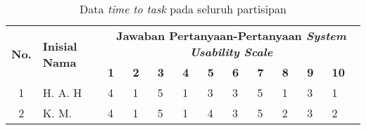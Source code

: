 \begin{table}[h]
    \centering
    \caption{Data \textit{time to task} pada seluruh partisipan}
    \label{system-usability-scale-data}
    \begin{tabularx}{\linewidth}{|c|p{3cm}|X|X|X|X|X|X|X|X|X|X|} \hline
        \multirow{2}{*}{\textbf{No.}} & \multirow{2}{*}{\textbf{Inisial Nama}} & \multicolumn{10}{c|}{\textbf{Jawaban Pertanyaan-Pertanyaan \textit{System Usability Scale}}}\\ \cline{3-12}
        & & \textbf{1} & \textbf{2} & \textbf{3} & \textbf{4} & \textbf{5} & \textbf{6} & \textbf{7} & \textbf{8} & \textbf{9} & \textbf{10}\\ \hline
        1 & H. A. H & 4 & 1 & 5 & 1 & 3 & 3 & 5 & 1 & 3 & 1\\ \hline
        2 & K. M. & 4 & 1 & 5 & 1 & 4 & 3 & 5 & 2 & 3 & 2\\ \hline
    \end{tabularx}
\end{table}
